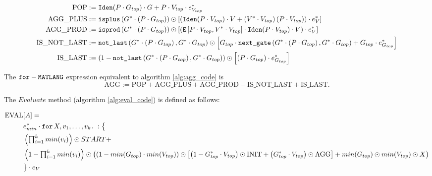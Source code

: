 \begin{align*}
	\text{POP} &:= \texttt{Iden}(P\cdot G_{top})\cdot G + P\cdot V_{top}\cdot e_{V_{top}}^*  \\
	\text{AGG{\_}PLUS} &:= \texttt{isplus}\left( G^* \cdot \left( P \cdot G_{top}\right) \right) \odot \left[ \left( \texttt{Iden}(P\cdot V_{top}) \cdot V + \left( V^* \cdot V_{top} \right)\left( P\cdot V_{top} \right)\right) \cdot e_{V}^* \right] \\
	\text{AGG{\_}PROD} &:= \texttt{isprod}\left(G^* \cdot \left( P \cdot G_{top}\right) \right) \odot \left[ \left( \texttt{E}\left[ P\cdot V_{top}, V^* \cdot V_{top} \right] \cdot \texttt{Iden}(P\cdot V_{top}) \cdot V \right) \cdot e_{V}^* \right] \\
	\text{IS{\_}NOT{\_}LAST} &:= \texttt{not{\_}last}\left(G^* \cdot \left( P \cdot G_{top}\right),G^* \cdot G_{top} \right) \odot \left[  G_{top} \cdot \texttt{next{\_}gate}\left(G^* \cdot \left( P\cdot G_{top} \right) , G^* \cdot G_{top} \right) + G_{top}\cdot e_{G_{top}}^* \right] \\
	\text{IS{\_}LAST} &:= \left( 1 - \texttt{not{\_}last}\left(G^* \cdot \left( P \cdot G_{top}\right),G^* \cdot G_{top} \right) \right)\odot \left[ \left( P\cdot G_{top} \right) \cdot e_{G_{top}}^* \right]
\end{align*}


The $\texttt{for}-\texttt{MATLANG}$ expression equivalent to algorithm \ref{alg:agg_code} is $$\text{AGG}:=\text{POP} + \text{AGG{\_}PLUS}+\text{AGG{\_}PROD}+\text{IS{\_}NOT{\_}LAST}+\text{IS{\_}LAST}.$$

The $Evaluate$ method (algorithm \ref{alg:eval_code}) is defined as follows:

\begin{align*}
	\text{EVAL}&[A]= \\
	&e_{min}^* \cdot \texttt{for}\, X,v_1, \ldots, v_k \texttt{.}\, : \big\lbrace \\
	&\left( \textstyle\prod_{i=1}^k min(v_i)\right) \odot START + \\
	&\left( 1- \textstyle\prod_{i=1}^k min(v_i)\right) \odot \left( \left(1 - min(G_{top})\cdot min(V_{top}) \right) \odot \left[ \left( 1 - G_{top}^*\cdot V_{top} \right) \odot \text{INIT} + \left(  G_{top}^*\cdot V_{top} \right) \odot \text{AGG} \right] + min(G_{top})\odot min(V_{top})\odot X\right) \\ 
	&\big\rbrace \cdot e_{V}
\end{align*}

